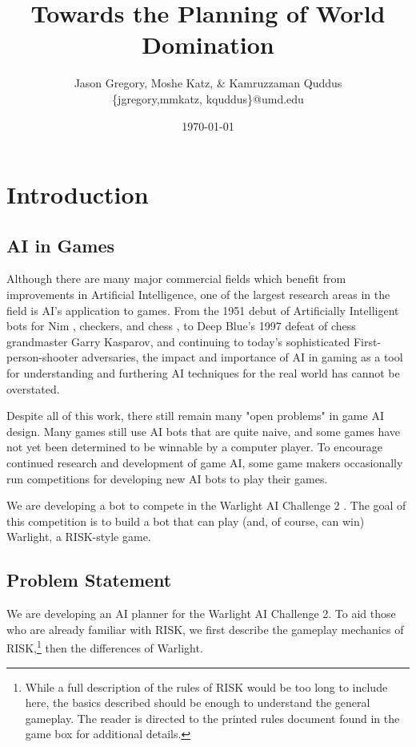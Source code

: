 \documentclass[a4paper,11pt]{article}
\begin{document}
\title{Towards the Planning of World Domination}
\author{Jason Gregory, Moshe Katz, \& Kamruzzaman Quddus \\ \{jgregory,mmkatz, kquddus\}@umd.edu}
\date{\today}

\maketitle

%

\section{Introduction}\label{sec:intro}
\subsection{AI in Games}\label{aiingames}
Although there are many major commercial fields which benefit from improvements
in Artificial Intelligence, one of the largest research areas in the field is
AI's application to games.  From the 1951 debut of Artificially Intelligent bots
for Nim \cite{nim}, checkers, and chess \cite{checkerschess}, to Deep Blue's 1997
defeat of chess grandmaster Garry Kasparov, and continuing to today's sophisticated
First-person-shooter adversaries, the impact and importance of AI in gaming as a
tool for understanding and furthering AI techniques for the real world has cannot
be overstated.

Despite all of this work, there still remain many "open problems" in game AI
design.  Many games still use AI bots that are quite naive, and some games have
not yet been determined to be winnable by a computer player. To encourage continued
research and development of game AI, some game makers occasionally run competitions
for developing new AI bots to play their games.

We are developing a bot to compete in the Warlight AI Challenge 2 \cite{warlight}.
The goal of this competition is to build a bot that can play (and, of course, can
win) Warlight, a RISK-style game.

\subsection{Problem Statement}\label{sec:problem}
We are developing an AI planner for the Warlight AI Challenge 2.  To aid those who
are already familiar with RISK, we first describe the gameplay mechanics of 
RISK,\footnote{While a full description of the rules of RISK would be too long to 
include here, the basics described should be enough to understand the general 
gameplay.  The reader is directed to the printed rules document found in the game 
box for additional details.} then the differences of Warlight.
\end{document}
